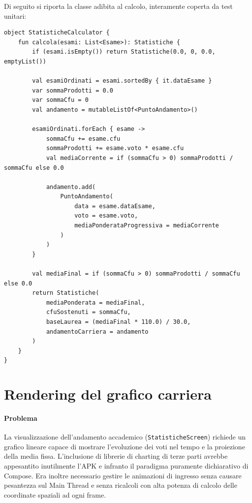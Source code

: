 \documentclass[a4paper,12pt]{report}
\begin{document}
    Di seguito si riporta la classe adibita al calcolo, interamente coperta da test unitari:

    \begin{lstlisting}
object StatisticheCalculator {
    fun calcola(esami: List<Esame>): Statistiche {
        if (esami.isEmpty()) return Statistiche(0.0, 0, 0.0, emptyList())

        val esamiOrdinati = esami.sortedBy { it.dataEsame }
        var sommaProdotti = 0.0
        var sommaCfu = 0
        val andamento = mutableListOf<PuntoAndamento>()

        esamiOrdinati.forEach { esame ->
            sommaCfu += esame.cfu
            sommaProdotti += esame.voto * esame.cfu
            val mediaCorrente = if (sommaCfu > 0) sommaProdotti / sommaCfu else 0.0
            
            andamento.add(
                PuntoAndamento(
                    data = esame.dataEsame,
                    voto = esame.voto,
                    mediaPonderataProgressiva = mediaCorrente
                )
            )
        }

        val mediaFinal = if (sommaCfu > 0) sommaProdotti / sommaCfu else 0.0
        return Statistiche(
            mediaPonderata = mediaFinal,
            cfuSostenuti = sommaCfu,
            baseLaurea = (mediaFinal * 110.0) / 30.0,
            andamentoCarriera = andamento
        )
    }
}
    \end{lstlisting}

    \section{Rendering del grafico carriera}

    \paragraph{Problema}
    La visualizzazione dell'andamento accademico (\texttt{StatisticheScreen}) richiede un grafico
    lineare capace di mostrare l'evoluzione dei voti nel tempo e la proiezione della media fissa.
    L'inclusione di librerie di charting di terze parti avrebbe appesantito inutilmente l'APK e
    infranto il paradigma puramente dichiarativo di Compose. Era inoltre necessario gestire le
    animazioni di ingresso senza causare pesantezza sul Main Thread e senza ricalcoli con alta potenza di calcolo
    delle coordinate spaziali ad ogni frame.
\end{document}

